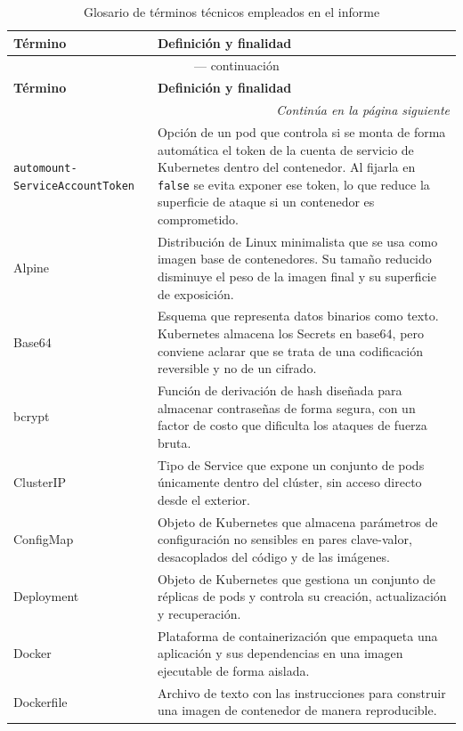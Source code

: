 \documentclass[stu,11pt,spanish,floatsintext]{apa7}
\begin{document}
\begin{longtable}{@{}p{}p{}@{}}
  \caption{Glosario de términos técnicos empleados en el informe}
  \label{tab:glosario} \\
  \toprule
  \textbf{Término} & \textbf{Definición y finalidad} \\
  \midrule
  \endfirsthead
  \multicolumn{2}{c}{\tablename\ \thetable{} — continuación} \\
  \toprule
  \textbf{Término} & \textbf{Definición y finalidad} \\
  \midrule
  \endhead
  \midrule
  \multicolumn{2}{r}{\textit{Continúa en la página siguiente}} \\
  \endfoot
  \bottomrule
  \endlastfoot

  \texttt{automount-} \texttt{ServiceAccountToken} & Opción de un pod que controla si se monta de forma automática el token de la cuenta de servicio de Kubernetes dentro del contenedor. Al fijarla en \texttt{false} se evita exponer ese token, lo que reduce la superficie de ataque si un contenedor es comprometido. \\
  Alpine & Distribución de Linux minimalista que se usa como imagen base de contenedores. Su tamaño reducido disminuye el peso de la imagen final y su superficie de exposición. \\
  Base64 & Esquema que representa datos binarios como texto. Kubernetes almacena los Secrets en base64, pero conviene aclarar que se trata de una codificación reversible y no de un cifrado. \\
  bcrypt & Función de derivación de hash diseñada para almacenar contraseñas de forma segura, con un factor de costo que dificulta los ataques de fuerza bruta. \\
  ClusterIP & Tipo de Service que expone un conjunto de pods únicamente dentro del clúster, sin acceso directo desde el exterior. \\
  ConfigMap & Objeto de Kubernetes que almacena parámetros de configuración no sensibles en pares clave-valor, desacoplados del código y de las imágenes. \\
  Deployment & Objeto de Kubernetes que gestiona un conjunto de réplicas de pods y controla su creación, actualización y recuperación. \\
  Docker & Plataforma de containerización que empaqueta una aplicación y sus dependencias en una imagen ejecutable de forma aislada. \\
  Dockerfile & Archivo de texto con las instrucciones para construir una imagen de contenedor de manera reproducible. \\

\end{longtable}
\end{document}
